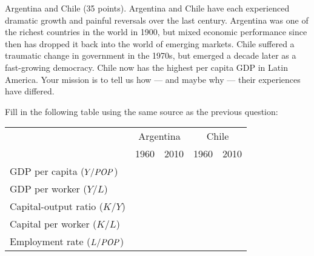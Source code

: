 \documentclass[12pt]{exam}
\newcommand{\POP}{\mbox{\it POP\/}}
\begin{document}
\begin{questions}
\begin{solution}
\begin{parts}
\end{parts}
\end{solution}

\question Argentina and Chile (35 points).
Argentina and Chile have each experienced
dramatic growth and painful reversals over the last century.
Argentina was one of the richest countries in the world in 1900,
but mixed economic performance since then has
dropped it back into the world of emerging markets.
Chile suffered a traumatic change in government in the 1970s,
but emerged a decade later as a fast-growing democracy.
Chile now has the highest per capita GDP in Latin America.
Your mission is to tell us how --- and maybe why
--- their experiences have differed.

Fill in the following table using the same
source as the previous question:

\begin{center}
\begin{tabular}{lcccc}
\toprule
        &  \multicolumn{2}{c}{Argentina}
        &  \multicolumn{2}{c}{Chile} \\
        \cmidrule(r){2-3}  \cmidrule(r){4-5}
        &  1960 & 2010 & 1960 & 2010 \\
\midrule
GDP per capita ($Y/\POP$) \phantom{xxxx}&  \\
GDP per worker ($Y/L$)    &  \\
Capital-output ratio ($K/Y$)  & \\
Capital per worker ($K/L$)    & \\
Employment rate ($L/\POP$)      & \\
\bottomrule
\end{tabular}
\end{center}
\medskip
%

\end{questions}
\end{document}
